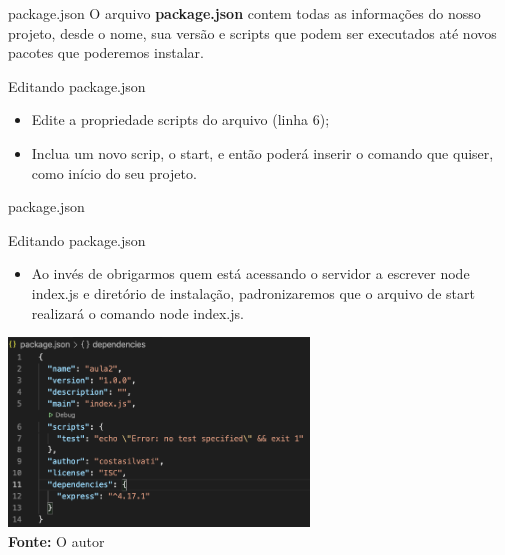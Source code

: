 \documentclass{beamer}
\begin{document}
    \begin{frame}[label=lists]{package.json}
	O arquivo \textbf{package.json} contem todas as informações do nosso projeto, desde o nome, sua versão e scripts que podem ser executados até novos pacotes que poderemos instalar.\\
	\begin{exampleblock}{Editando package.json}
	\begin{itemize}
	\item Edite a propriedade scripts do arquivo (linha 6);
	\item Inclua um novo scrip, o start, e então poderá inserir o comando que quiser, como início do seu projeto. 

	\end{itemize}
	\end{exampleblock}

    \end{frame}
    \begin{frame}[label=lists]{package.json}
		\begin{exampleblock}{Editando package.json}
	\begin{itemize}
	\item Ao invés de obrigarmos quem está acessando o servidor a escrever node index.js e diretório de instalação, padronizaremos que o arquivo de start realizará o comando \alert{node index.js}.
	\end{itemize}
	\end{exampleblock}
	 \includegraphics[width=80mm]{resources/aula3_2.png}\\
            \tiny{\textbf{Fonte:} O autor}

    \end{frame}
   
\end{document}
